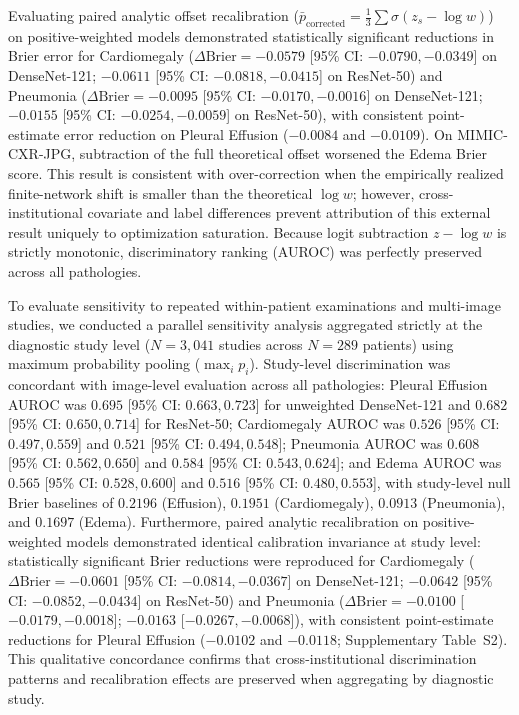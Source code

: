 \documentclass[preprint,12pt]{elsarticle}
\begin{document}
Evaluating paired analytic offset recalibration ($\bar{p}_{\text{corrected}} = \frac{1}{3}\sum \sigma(z_s - \log w)$) on positive-weighted models demonstrated statistically significant reductions in Brier error for Cardiomegaly ($\Delta\text{Brier} = -0.0579$ [95\% CI: $-0.0790, -0.0349$] on DenseNet-121; $-0.0611$ [95\% CI: $-0.0818, -0.0415$] on ResNet-50) and Pneumonia ($\Delta\text{Brier} = -0.0095$ [95\% CI: $-0.0170, -0.0016$] on DenseNet-121; $-0.0155$ [95\% CI: $-0.0254, -0.0059$] on ResNet-50), with consistent point-estimate error reduction on Pleural Effusion ($-0.0084$ and $-0.0109$). On MIMIC-CXR-JPG, subtraction of the full theoretical offset worsened the Edema Brier score. This result is consistent with over-correction when the empirically realized finite-network shift is smaller than the theoretical $\log w$; however, cross-institutional covariate and label differences prevent attribution of this external result uniquely to optimization saturation. Because logit subtraction $z - \log w$ is strictly monotonic, discriminatory ranking (AUROC) was perfectly preserved across all pathologies.

To evaluate sensitivity to repeated within-patient examinations and multi-image studies, we conducted a parallel sensitivity analysis aggregated strictly at the diagnostic study level ($N = 3,041$ studies across $N = 289$ patients) using maximum probability pooling ($\max_i p_i$). Study-level discrimination was concordant with image-level evaluation across all pathologies: Pleural Effusion AUROC was $0.695$ [95\% CI: $0.663, 0.723$] for unweighted DenseNet-121 and $0.682$ [95\% CI: $0.650, 0.714$] for ResNet-50; Cardiomegaly AUROC was $0.526$ [95\% CI: $0.497, 0.559$] and $0.521$ [95\% CI: $0.494, 0.548$]; Pneumonia AUROC was $0.608$ [95\% CI: $0.562, 0.650$] and $0.584$ [95\% CI: $0.543, 0.624$]; and Edema AUROC was $0.565$ [95\% CI: $0.528, 0.600$] and $0.516$ [95\% CI: $0.480, 0.553$], with study-level null Brier baselines of $0.2196$ (Effusion), $0.1951$ (Cardiomegaly), $0.0913$ (Pneumonia), and $0.1697$ (Edema). Furthermore, paired analytic recalibration on positive-weighted models demonstrated identical calibration invariance at study level: statistically significant Brier reductions were reproduced for Cardiomegaly ($\Delta\text{Brier} = -0.0601$ [95\% CI: $-0.0814, -0.0367$] on DenseNet-121; $-0.0642$ [95\% CI: $-0.0852, -0.0434$] on ResNet-50) and Pneumonia ($\Delta\text{Brier} = -0.0100$ [$-0.0179, -0.0018$]; $-0.0163$ [$-0.0267, -0.0068$]), with consistent point-estimate reductions for Pleural Effusion ($-0.0102$ and $-0.0118$; Supplementary Table~S2). This qualitative concordance confirms that cross-institutional discrimination patterns and recalibration effects are preserved when aggregating by diagnostic study.
\end{document}
